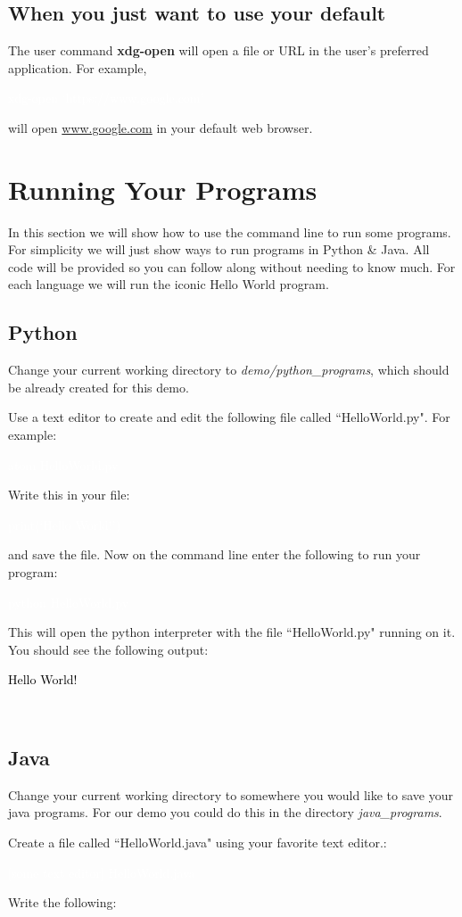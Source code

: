 \documentclass[oneside]{book}
\newcommand{\commandline}[1]{\begin{center} \colorbox{Dark}{\textcolor{white}{#1}} \end{center}}
\newcommand{\exampleout}[1]{\begin{center} \colorbox{Light}{\textcolor{black}{#1}} \end{center}}
\begin{document}
\subsection{When you just want to use your default}
The user command \textbf{xdg-open} will open a file or URL in the user's preferred application. For example,
\commandline{xdg-open `https://www.google.com'}

will open \url{www.google.com} in your default web browser.

\section{Running Your Programs}
In this section we will show how to use the command line to run some programs. For simplicity we will just show ways to run programs in Python \& Java. All code will be provided so you can follow along without needing to know much. For each language we will run the iconic Hello World program.
\subsection{Python}
Change your current working directory to \textit{demo/python\_programs}, which should be already created for this demo.

Use a text editor to create and edit the following file called ``HelloWorld.py". For example:
\commandline{atom HelloWorld.py}

Write this in your file:

\commandline{print(`Hello World!')}
 and save the file. Now on the command line enter the following to run your program:
\commandline{python HelloWorld.py}
This will open the python interpreter with the file ``HelloWorld.py" running on it. You should see the following output:
\exampleout{Hello World!}\\

\subsection{Java}
Change your current working directory to somewhere you would like to save your java programs. For our demo you could do this in the directory \textit{java\_programs}.

Create a file called ``HelloWorld.java" using your favorite text editor.:

\commandline{[some text editor] HelloWorld.java}

Write the following:
\end{document}
